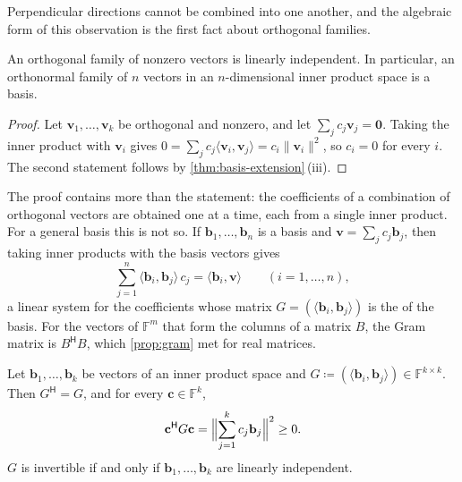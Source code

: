 Perpendicular directions cannot be combined into one another, and the algebraic form of this observation is the first fact about orthogonal families.

\begin{proposition}
\label{prop:orthogonal-independent}
An orthogonal family of nonzero vectors is linearly independent. In particular, an orthonormal family of $n$ vectors in an $n$-dimensional inner product space is a basis.
\end{proposition}

\begin{proof}
Let $\mathbf v_1,\ldots,\mathbf v_k$ be orthogonal and nonzero, and let $\sum_jc_j\mathbf v_j=\mathbf 0$. Taking the inner product with $\mathbf v_i$ gives $0=\sum_jc_j\langle\mathbf v_i,\mathbf v_j\rangle=c_i\|\mathbf v_i\|^2$, so $c_i=0$ for every $i$. The second statement follows by \cref{thm:basis-extension}\,(iii).
\end{proof}

The proof contains more than the statement: the coefficients of a combination of orthogonal vectors are obtained one at a time, each from a single inner product. For a general basis this is not so. If $\mathbf b_1,\ldots,\mathbf b_n$ is a basis and $\mathbf v=\sum_jc_j\mathbf b_j$, then taking inner products with the basis vectors gives
\begin{equation}
\sum_{j=1}^n\langle\mathbf b_i,\mathbf b_j\rangle\,c_j=\langle\mathbf b_i,\mathbf v\rangle\qquad(i=1,\ldots,n),
\label{eq:gram-system}
\end{equation}
a linear system for the coefficients whose matrix $G=(\langle\mathbf b_i,\mathbf b_j\rangle)$ is the  of the basis. For the vectors of $\mathbb F^m$ that form the columns of a matrix $B$, the Gram matrix is $B^{\mathsf H}B$, which \cref{prop:gram} met for real matrices.

\begin{lemma}
\label{lem:gram-matrix}
Let $\mathbf b_1,\ldots,\mathbf b_k$ be vectors of an inner product space and $G\coloneqq(\langle\mathbf b_i,\mathbf b_j\rangle)\in\mathbb F^{k\times k}$. Then $G^{\mathsf H}=G$, and for every $\mathbf c\in\mathbb F^k$,
\[
\mathbf c^{\mathsf H}G\mathbf c=\Bigl\|\sum_{j=1}^kc_j\mathbf b_j\Bigr\|^2\ge0 .
\]
$G$ is invertible if and only if $\mathbf b_1,\ldots,\mathbf b_k$ are linearly independent.
\end{lemma}

